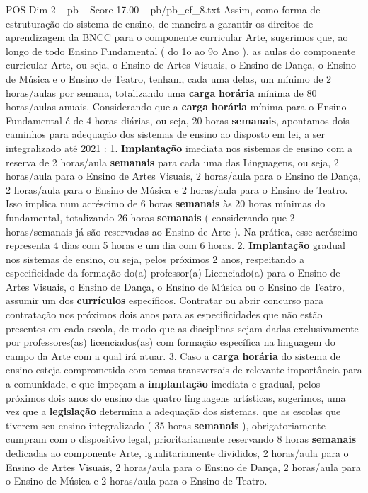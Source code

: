 \begin{textsample}{POS Dim 2 – pb – Score 17.00 – pb/pb\_ef\_8.txt}
Assim, como forma de estruturação do sistema de ensino, de maneira a garantir os direitos de aprendizagem da BNCC para o componente curricular Arte, sugerimos que, ao longo de todo Ensino Fundamental ( do 1o ao 9o Ano ), as aulas do componente curricular Arte, ou seja, o Ensino de Artes Visuais, o Ensino de Dança, o Ensino de Música e o Ensino de Teatro, tenham, cada uma delas, um mínimo de 2 horas/aulas por semana, totalizando uma \textbf{carga} \textbf{horária} mínima de 80 horas/aulas anuais.
Considerando que a \textbf{carga} \textbf{horária} mínima para o Ensino Fundamental é de 4 horas diárias, ou seja, 20 horas \textbf{semanais}, apontamos dois caminhos para adequação dos sistemas de ensino ao disposto em lei, a ser integralizado até 2021 : 1. \textbf{Implantação} imediata nos sistemas de ensino com a reserva de 2 horas/aula \textbf{semanais} para cada uma das Linguagens, ou seja, 2 horas/aula para o Ensino de Artes Visuais, 2 horas/aula para o Ensino de Dança, 2 horas/aula para o Ensino de Música e 2 horas/aula para o Ensino de Teatro.
Isso implica num acréscimo de 6 horas \textbf{semanais} às 20 horas mínimas do fundamental, totalizando 26 horas \textbf{semanais} ( considerando que 2 horas/semanais já são reservadas ao Ensino de Arte ).
Na prática, esse acréscimo representa 4 dias com 5 horas e um dia com 6 horas. 2. \textbf{Implantação} gradual nos sistemas de ensino, ou seja, pelos próximos 2 anos, respeitando a especificidade da formação do(a) professor(a) Licenciado(a) para o Ensino de Artes Visuais, o Ensino de Dança, o Ensino de Música ou o Ensino de Teatro, assumir um dos \textbf{currículos} específicos.
Contratar ou abrir concurso para contratação nos próximos dois anos para as especificidades que não estão presentes em cada escola, de modo que as disciplinas sejam dadas exclusivamente por professores(as) licenciados(as) com formação específica na linguagem do campo da Arte com a qual irá atuar. 3.
Caso a \textbf{carga} \textbf{horária} do sistema de ensino esteja comprometida com temas transversais de relevante importância para a comunidade, e que impeçam a \textbf{implantação} imediata e gradual, pelos próximos dois anos do ensino das quatro linguagens artísticas, sugerimos, uma vez que a \textbf{legislação} determina a adequação dos sistemas, que as escolas que tiverem seu ensino integralizado ( 35 horas \textbf{semanais} ), obrigatoriamente cumpram com o dispositivo legal, prioritariamente reservando 8 horas \textbf{semanais} dedicadas ao componente Arte, igualitariamente divididos, 2 horas/aula para o Ensino de Artes Visuais, 2 horas/aula para o Ensino de Dança, 2 horas/aula para o Ensino de Música e 2 horas/aula para o Ensino de Teatro.

\end{textsample}
